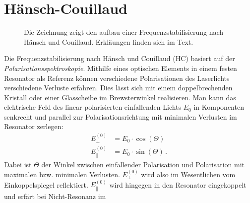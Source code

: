 \section{Hänsch-Couillaud}\label{sec:haensch-couillaud}
\begin{figure}[h]
 	\centering
	\caption[Hänsch-Couillaud - Aufbau]{Die Zeichnung zeigt den aufbau
	einer Frequenzstabilisierung nach Hänsch
	und Couillaud. Erkläungen finden sich im
	Text.}\label{fig:haensch-couillaud_aufbau}
\end{figure}
Die Frequenzstabilisierung nach Hänsch und Couillaud (HC)
basiert auf der \textit{Polarisationsspektroskopie}. Mithilfe eines
optischen Elements in einem festen Resonator als Referenz können verschiedene
Polarisationen des Laserlichts verschiedene Verluste erfahren. Dies lässt sich
mit einem doppelbrechenden Kristall oder einer Glasscheibe im Brewsterwinkel
realisieren. Man kann das elektrische Feld des linear polarisierten einfallenden
Lichts $E_0$ in Komponenten senkrecht und parallel zur Polarisationsrichtung mit
minimalen Verlusten im Resonator zerlegen:
\begin{equation}\label{eq:haensch-couillaud_01}
	\begin{split}
		E_{\perp}^{(0)} & = E_0\cdot\cos{(\Theta)}\\
		E_{\parallel}^{(0)} & = E_0\cdot\sin{(\Theta)}\,.
	\end{split}
\end{equation}
Dabei ist $\Theta$ der Winkel zwischen einfallender Polarisation und
Polarisation mit maximalen bzw. minimalen Verlusten. $E_{\perp}^{(0)}$ wird also
im Wesentlichen vom Einkoppelspiegel reflektiert. $E_{\parallel}^{(0)}$
wird hingegen in den Resonator eingekoppelt und erfärt bei Nicht-Resonanz im

